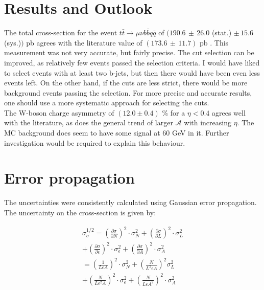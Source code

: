 \documentclass[%
 reprint,
 amsmath,amssymb,
 aps,
]{revtex4-2}
\begin{document}
\section{Results and Outlook}

The total cross-section for the event $t \bar t \rightarrow \mu \nu b \bar b q \bar q$ of 
$(190.6 \, \pm \, 26.0$ (stat.) $\pm \, 15.6$ (sys.)$)$ pb agrees with the literature value of $(173.6 \, \pm \, 11.7)$ pb \cite{workman_review_2022}. This measurement was not very accurate, but fairly precise. The cut selection can be improved, as relatively few events passed the selection criteria. I would have liked to select events with at least two b-jets, but then there would have been even less events left.
On the other hand, if the cuts are less strict, there would be more background events passing the selection. For more precise and accurate results, one should use a more systematic approach for selecting the cuts. \\
The W-boson charge asymmetry of  $(12.0 \pm 0.4)$ \% for a $\eta < 0.4$ agrees well with the literature, as does the general trend of larger $\mathcal{A}$ with increasing $\eta$. The MC background does seem to have some signal at 60 GeV in it. Further investigation would be required to explain this behaviour. 








\section{Error propagation}

The uncertainties were consistently calculated using Gaussian error propagation. 
The uncertainty on the cross-section is given by:

\begin{multline}\label{eq:cross_sec_err}
    \sigma_{\sigma}^{1/2} = \left(\frac{\partial \sigma}{\partial N}\right)^2 \cdot \sigma_N^2 + \left(\frac{\partial \sigma}{\partial L}\right)^2 \cdot \sigma_L^2 \\
    + \left(\frac{\partial \sigma}{\partial \epsilon}\right)^2 \cdot \sigma_{\epsilon}^2 + \left(\frac{\partial \sigma}{\partial A}\right)^2 \cdot \sigma_A^2 \\
    = \left(\frac{1}{L \epsilon A}\right)^2 \cdot \sigma_N^2 + \left(\frac{N}{L^2 \epsilon A}\right)^2 \sigma_L^2 \\
    + \left(\frac{N}{L \epsilon^2 A}\right)^2 \cdot \sigma_{\epsilon}^2 + \left(\frac{N}{L \epsilon A^2}\right)^2 \cdot \sigma_A^2
\end{multline}
\end{document}
